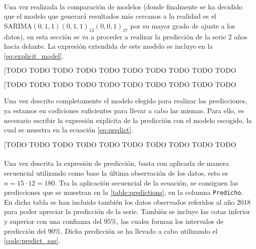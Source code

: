 \documentclass[a4paper, spanish]{article}
\begin{document}
    \paragraph{}
    Una vez realizada la comparación de modelos (donde finalmente se ha decidido que el modelo que generará resultados más cercanos a la realidad es el \textbf{$\text{SARIMA}(0, 1, 1)(0, 1, 1)_{12}(0, 0, 1)_{17}$} por su mayor grado de ajuste a los datos), en esta sección se va a proceder a realizar la predicción de la serie 2 años hacia delante. La expresión extendida de este modelo se incluye en la \autoref{eq:explicit_model}.

    \begin{equation}
    \label{eq:explicit_model}
      \text{[TODO TODO TODO TODO TODO TODO TODO TODO TODO TODO TODO ]}
    \end{equation}

    \begin{equation}
    \label{eq:explicit_model_extended}
      \text{[TODO TODO TODO TODO TODO TODO TODO TODO TODO TODO TODO ]}
    \end{equation}

    Una vez descrito completamente el modelo elegido para realizar las predicciones, ya estamos en codiciones suficientes para llevar a cabo las mismas. Para ello, es necesario escribir la expresión explícita de la predicción con el modelo escogido, la cual se muestra en la ecuación \autoref{eq:predict}.

    \begin{equation}
    \label{eq:predict}
      \text{[TODO TODO TODO TODO TODO TODO TODO TODO TODO TODO TODO ]}
    \end{equation}

    \paragraph{}
    Una vez descrita la expresión de predicción, basta con aplicarla de manera secuencial utilizando como base la última observación de los datos, esto es $n = 15 \cdot 12 = 180$. Tra la aplicación secuencial de la ecuación, se consiguen las predicciones que se muestran en la \autoref{table:predictions}, en la columna \texttt{Predicho}. En dicha tabla se han incluido también los datos observados referidos al año $2018$ para poder apreciar la predicción de la serie. También se incluye las cotas inferior y superior con una confianza del $95\%$, las cuales forman los intervalos de predicción del $90\%$. Dicha predicción se ha llevado a cabo utilizando el \autoref{code:predict_sas}.
\end{document}
